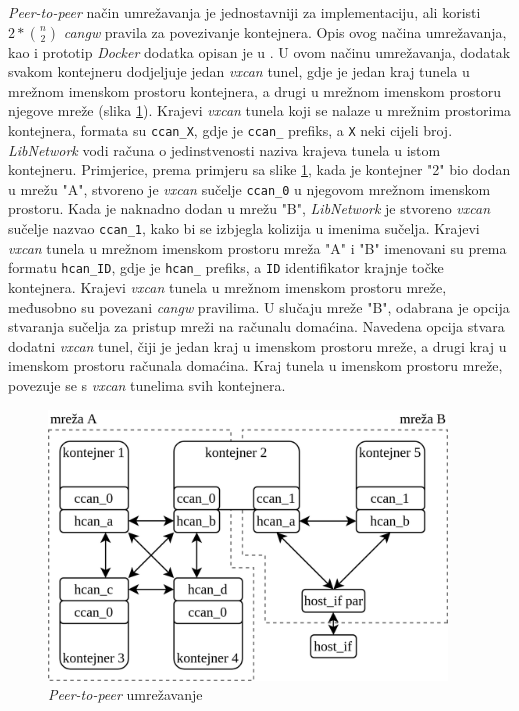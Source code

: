 \documentclass[times, utf8, diplomski, numeric]{fer}
\begin{document}
\textit{Peer-to-peer} način umrežavanja je jednostavniji za implementaciju, ali koristi $2*\binom{n}{2}$ \textit{cangw} pravila za povezivanje kontejnera. Opis ovog načina umrežavanja, kao i prototip \textit{Docker} dodatka opisan je u \cite{lkml2018candocker}. U ovom načinu umrežavanja, dodatak svakom kontejneru dodjeljuje jedan \textit{vxcan} tunel, gdje je jedan kraj tunela u mrežnom imenskom prostoru kontejnera, a drugi u mrežnom imenskom prostoru njegove mreže (slika \ref{fig:p2p}). Krajevi \textit{vxcan} tunela koji se nalaze u mrežnim prostorima kontejnera, formata su \texttt{ccan\_X}, gdje je \texttt{ccan\_} prefiks, a \texttt{X} neki cijeli broj. \textit{LibNetwork} vodi računa o jedinstvenosti naziva krajeva tunela u istom kontejneru. Primjerice, prema primjeru sa slike \ref{fig:p2p}, kada je kontejner "2" bio dodan u mrežu "A", stvoreno je \textit{vxcan} sučelje \texttt{ccan\_0} u njegovom mrežnom imenskom prostoru. Kada je naknadno dodan u mrežu "B", \textit{LibNetwork} je stvoreno \textit{vxcan} sučelje nazvao \texttt{ccan\_1}, kako bi se izbjegla kolizija u imenima sučelja. Krajevi \textit{vxcan} tunela u mrežnom imenskom prostoru mreža "A" i "B" imenovani su prema formatu \texttt{hcan\_ID}, gdje je \texttt{hcan\_} prefiks, a \texttt{ID} identifikator krajnje točke  kontejnera. Krajevi \textit{vxcan} tunela u mrežnom imenskom prostoru mreže, međusobno su povezani \textit{cangw} pravilima. U slučaju mreže "B", odabrana je opcija stvaranja sučelja za pristup mreži na računalu domaćina. Navedena opcija stvara dodatni \textit{vxcan} tunel, čiji je jedan kraj u imenskom prostoru mreže, a drugi kraj u imenskom prostoru računala domaćina. Kraj tunela u imenskom prostoru mreže, povezuje se s \textit{vxcan} tunelima svih kontejnera.

\begin{figure}[htb]
\centering
\includegraphics[width=300pt]{necentralizirano_dc.png}
\caption{\textit{Peer-to-peer} umrežavanje}
\label{fig:p2p}
\end{figure}
\end{document}
